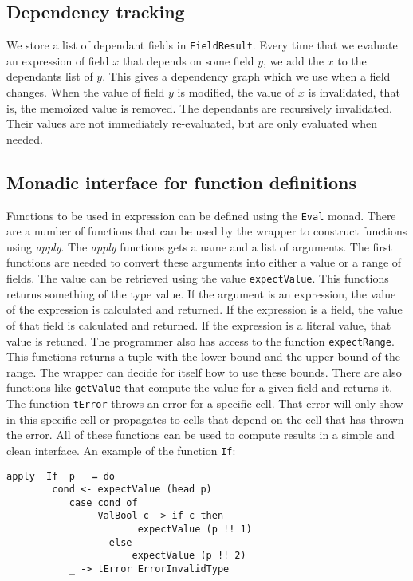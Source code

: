 \documentclass{article}
\begin{document}
	\subsection{Dependency tracking}
	We store a list of dependant fields in \texttt{FieldResult}. Every time that we evaluate an expression of field $x$ that depends on some field $y$, we add the $x$ to the dependants list of $y$. This gives a dependency graph which we use when a field changes. When the value of field $y$ is modified, the value of $x$ is invalidated, that is, the memoized value is removed. The dependants are recursively invalidated. Their values are not immediately re-evaluated, but are only evaluated when needed.
	
	\subsection{Monadic interface for function definitions}
	Functions to be used in expression can be defined using the \texttt{Eval} monad. There are a number of functions that can be used by the wrapper to construct functions using \textit{apply}. The \textit{apply} functions gets a name and a list of arguments. The first functions are needed to convert these arguments into either a value or a range of fields. The value can be retrieved using the value \texttt{expectValue}. This functions returns something of the type value. If the argument is an expression, the value of the expression is calculated and returned. If the expression is a field, the value of that field is calculated and returned. If the expression is a literal value, that value is retuned. The programmer also has access to the function \texttt{expectRange}. This functions returns a tuple with the lower bound and the upper bound of the range. The wrapper can decide for itself how to use these bounds. There are also functions like \texttt{getValue} that compute the value for a given field and returns it. The function \texttt{tError} throws an error for a specific cell. That error will only show in this specific cell or propagates to cells that depend on the cell that has thrown the error. All of these functions can be used to compute results in a simple and clean interface. An example of the function \texttt{If}:
\begin{verbatim}
apply  If  p   = do
		cond <- expectValue (head p)
           case cond of
                ValBool c -> if c then
              		   expectValue (p !! 1)
           		  else
               		  expectValue (p !! 2)
           _ -> tError ErrorInvalidType                  	
\end{verbatim}	
\end{document}
